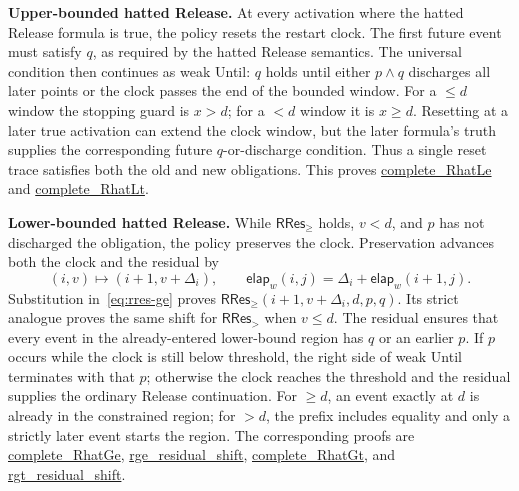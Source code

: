 \documentclass{ieeeaccess}
\newcommand{\elapsed}{\mathsf{elap}}
\newcommand{\runinhead}[1]{\par\noindent\textbf{#1}\enspace}
\newcommand{\Rocqid}[1]{\url{#1}}
\begin{document}
\runinhead{Upper-bounded hatted Release.}
At every activation where the hatted Release formula is true, the policy
resets the restart clock. The first future event must satisfy $q$, as
required by the hatted Release semantics. The universal condition then
continues as weak Until: $q$ holds until either $p\land q$ discharges all
later points or the clock passes the end of the bounded window. For a
$\le d$ window the stopping guard is $x>d$; for a $<d$ window it is
$x\ge d$. Resetting at a later true activation can extend the clock window,
but the later formula's truth supplies the corresponding future
$q$-or-discharge condition. Thus a single reset trace satisfies both the old
and new obligations. This proves \Rocqid{complete_RhatLe} and
\Rocqid{complete_RhatLt}.

\runinhead{Lower-bounded hatted Release.}
While $\mathsf{RRes}_{\ge}$ holds, $v<d$, and $p$ has not discharged the
obligation, the policy preserves the clock. Preservation advances both the
clock and the residual by
\[
(i,v)\longmapsto(i+1,v+\Delta_i),
\qquad
\elapsed_w(i,j)=\Delta_i+\elapsed_w(i+1,j).
\]
Substitution in~\eqref{eq:rres-ge} proves
$\mathsf{RRes}_{\ge}(i+1,v+\Delta_i,d,p,q)$. Its strict analogue proves the
same shift for $\mathsf{RRes}_{>}$ when $v\le d$. The residual ensures that
every event in the already-entered lower-bound region has $q$ or an earlier
$p$. If $p$ occurs while the clock is still below threshold, the right side
of weak Until terminates with that $p$; otherwise the clock reaches the
threshold and the residual supplies the ordinary Release continuation.
For $\ge d$, an event exactly at $d$ is already in the constrained region;
for $>d$, the prefix includes equality and only a strictly later event
starts the region. The corresponding proofs are
\Rocqid{complete_RhatGe}, \Rocqid{rge_residual_shift},
\Rocqid{complete_RhatGt}, and \Rocqid{rgt_residual_shift}.
\end{document}
